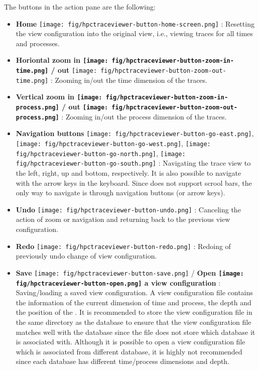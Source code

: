 The buttons in the action pane are the following:
\begin{itemize}

\item \textbf{Home} \texttt{[image: fig/hpctraceviewer-button-home-screen.png]} : Resetting the view configuration into the original view, i.e., viewing traces for all times and processes.
\item \textbf{Horiontal zoom in \texttt{[image: fig/hpctraceviewer-button-zoom-in-time.png]} / out }\texttt{[image: fig/hpctraceviewer-button-zoom-out-time.png]} : Zooming in/out the time dimension of the traces. 
\item \textbf{Vertical zoom in \texttt{[image: fig/hpctraceviewer-button-zoom-in-process.png]} / out \texttt{[image: fig/hpctraceviewer-button-zoom-out-process.png]} }: Zooming in/out the process dimension of the traces.
\item \textbf{Navigation buttons} \texttt{[image: fig/hpctraceviewer-button-go-east.png]}, \texttt{[image: fig/hpctraceviewer-button-go-west.png]}, \texttt{[image: fig/hpctraceviewer-button-go-north.png]}, \texttt{[image: fig/hpctraceviewer-button-go-south.png]} : Navigating the trace view to the left, right, up and bottom, respectively. It is also possible to navigate with the arrow keys in the keyboard. Since \traceview{} does not support scrool bars, the only way to navigate is through navigation buttons (or arrow keys).
\item \textbf{Undo} \texttt{[image: fig/hpctraceviewer-button-undo.png]} : Canceling the action of zoom or navigation and returning back to the previous view configuration.
\item \textbf{Redo} \texttt{[image: fig/hpctraceviewer-button-redo.png]} : Redoing of previously undo change of view configuration.
\item \textbf{Save} \texttt{[image: fig/hpctraceviewer-button-save.png]}  / \textbf{Open \texttt{[image: fig/hpctraceviewer-button-open.png]} a view configuration} : Saving/loading a saved view configuration. 
A view configuration file contains the information of the current dimension of time and process, the depth and the position of the \crosshair{}. 
It is recommended to store the view configuration file in the same directory as the database to ensure that the view configuration file matches well with the database since the file does not store which database it is associated with. 
Although it is possible to open a view configuration file which is associated from different database, it is highly not recommended since each database has different time/process dimensions and depth.


\end{itemize}

